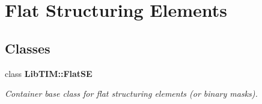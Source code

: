 \section{Flat Structuring Elements}
\label{group__FlatSE}
\subsection*{Classes}
\begin{CompactItemize}
\item 
class {\bf Lib\-TIM::Flat\-SE}
\begin{CompactList}\small\item\em Container base class for flat structuring elements (or binary masks). \item\end{CompactList}\end{CompactItemize}
